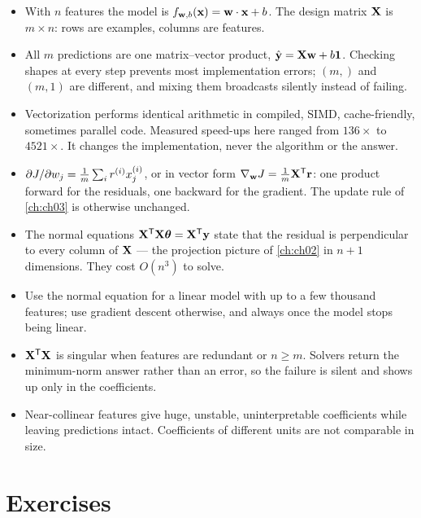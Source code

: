 \begin{itemize}
  \item With $n$ features the model is $f_{\mathbf{w},b}(\mathbf{x}) = \mathbf{w}\cdot\mathbf{x} + b$. The
        design matrix $\mathbf{X}$ is $m\times n$: rows are examples, columns are
        features.
  \item All $m$ predictions are one matrix--vector product,
        $\hat{\mathbf{y}} = \mathbf{X}\mathbf{w} + b\mathbf{1}$. Checking shapes at every step
        prevents most implementation errors; $(m,)$ and $(m,1)$ are different,
        and mixing them broadcasts silently instead of failing.
  \item Vectorization performs identical arithmetic in compiled, SIMD,
        cache-friendly, sometimes parallel code. Measured speed-ups here ranged
        from $136\times$ to $4521\times$. It changes the implementation, never
        the algorithm or the answer.
  \item $\partial J/\partial w_j = \frac1m\sum_i r^{(i)}x^{(i)}_{j}$, or in
        vector form $\nabla_{\mathbf{w}}J = \frac1m\mathbf{X}^{\mathsf{T}}\mathbf{r}$: one
        product forward for the residuals, one backward for the gradient. The
        update rule of \cref{ch:ch03} is otherwise unchanged.
  \item The normal equations $\mathbf{X}^{\mathsf{T}}\mathbf{X}\bm{\theta} =
        \mathbf{X}^{\mathsf{T}}\mathbf{y}$ state that the residual is perpendicular to every
        column of $\mathbf{X}$ --- the projection picture of \cref{ch:ch02} in $n+1$
        dimensions. They cost $O(n^3)$ to solve.
  \item Use the normal equation for a linear model with up to a few thousand
        features; use gradient descent otherwise, and always once the model
        stops being linear.
  \item $\mathbf{X}^{\mathsf{T}}\mathbf{X}$ is singular when features are redundant or
        $n \ge m$. Solvers return the minimum-norm answer rather than an error,
        so the failure is silent and shows up only in the coefficients.
  \item Near-collinear features give huge, unstable, uninterpretable
        coefficients while leaving predictions intact. Coefficients of different
        units are not comparable in size.
\end{itemize}

\section*{Exercises}

